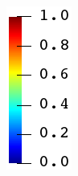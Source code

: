 \begin{figure}[htb!]
\begin{subfigure}[b]{0.065\textwidth}
    \includegraphics[width=\textwidth]{Chapter4/figures/jet_vertical.png}
    \vspace{0.15in}
  \end{subfigure}
  

\end{figure}
